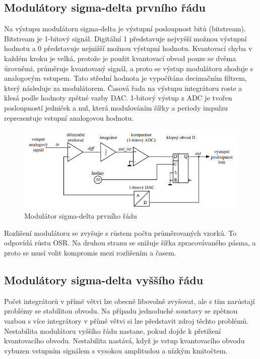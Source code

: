 \subsection{Modulátory sigma-delta prvního řádu}
Na výstupu modulátoru sigma-delta je výstupní posloupnost bitů (bitstream). Bitstream je 1-bitový signál. Digitální 1 představuje nejvyšší možnou výstupní hodnotu a 0 představuje nejnižší možnou výstupní hodnotu. Kvantovací chyba v každém kroku je velká, protože je použit kvantovací obvod pouze se dvěma úrovněmi, průměruje kvantovaný signál, a proto se výstup modulátoru shoduje s analogovým vstupem. Tato střední hodnota je vypočítána decimačním filtrem, který následuje za modulátorem. Časová řada na výstupu integrátoru roste a klesá podle hodnoty zpětné vazby DAC. 1-bitový výstup z ADC je tvořen posloupností jedniček a nul, která modulováním šířky a periody impulzu reprezentuje vstupní analogovou hodnotu.
\begin{figure}[h]
   \begin{center}
     \includegraphics[scale=0.6]{images/sigmajedna.png}
   \end{center}
   \caption{Modulátor sigma-delta prvního řádu}
\end{figure}

Rozlišení modulátoru se zvyšuje s růstem počtu průměrovaných vzorků. To odpovídá růstu OSR. Na druhou stranu se snižuje šířka zpracovávaného pásma, a proto se musí volit kompromis mezi rozlišením a časem.

\subsection{Modulátory sigma-delta vyššího řádu}
Počet integrátorů v přímé větvi lze obecně libovolně zvyšovat, ale s tím narůstají problémy se stabilitou obvodu. Na případu jednoduché soustavy se zpětnou vazbou s více integrátory v přímé větvi si lze představit zdroj těchto problémů. Nestabilita modulátoru vyššího řádu nastane, pokud dojde k přetížení kvantovacího obvodu. Nestabilita nastává, když je vstup kvantovacího obvodu vybuzen vstupním signálem s vysokou amplitudou a nízkým kmitočtem.

